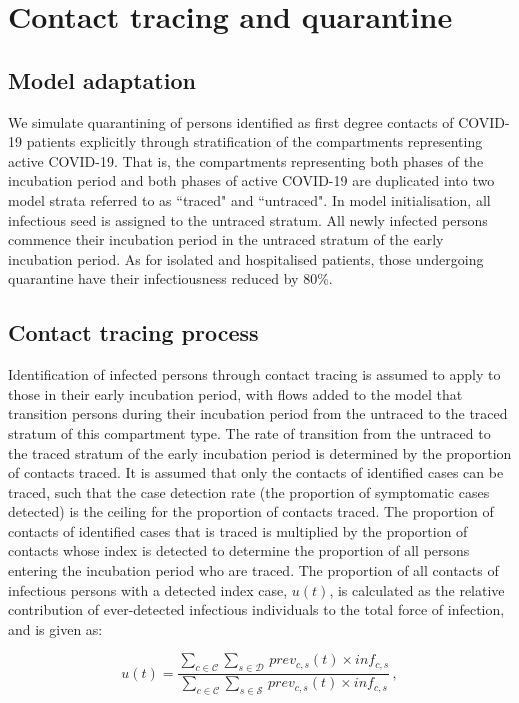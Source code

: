 \section{Contact tracing and quarantine}

\subsection{Model adaptation}
We simulate quarantining of persons identified as first degree contacts of COVID-19 patients explicitly through stratification of the compartments representing active COVID-19.
That is, the compartments representing both phases of the incubation period and both phases of active COVID-19 are duplicated into two model strata referred to as ``traced" and ``untraced".
In model initialisation, all infectious seed is assigned to the untraced stratum.
All newly infected persons commence their incubation period in the untraced stratum of the early incubation period.
As for isolated and hospitalised patients, those undergoing quarantine have their infectiousness reduced by 80\%.

\subsection{Contact tracing process}
Identification of infected persons through contact tracing is assumed to apply to those in their early incubation period, with flows added to the model that transition persons during their incubation period from the untraced to the traced stratum of this compartment type.
The rate of transition from the untraced to the traced stratum of the early incubation period is determined by the proportion of contacts traced.
It is assumed that only the contacts of identified cases can be traced, such that the case detection rate (the proportion of symptomatic cases detected) is the ceiling for the proportion of contacts traced.
The proportion of contacts of identified cases that is traced is multiplied by the proportion of contacts whose index is detected  to determine the proportion of all persons entering the incubation period who are traced.
The proportion of all contacts of infectious persons with a detected index case, \(u(t)\), is calculated as the relative contribution of ever-detected infectious individuals to the total force of infection, and is given as:

\[
u(t) = \frac
{\sum_{c \in \mathcal{C}} \sum_{s \in \mathcal{D}} \, prev_{c, s}(t) \times inf_{c, s}}
{\sum_{c \in \mathcal{C}} \sum_{s \in \mathcal{S}} \, prev_{c, s}(t) \times inf_{c, s}} \, ,
\]

